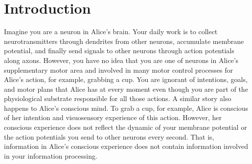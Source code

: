 \documentclass[utf8]{article}
\begin{document}

    \newpage
	\section{Introduction}

		Imagine you are a neuron in Alice's brain. Your daily work is to collect neurotransmitters through dendrites from other neurons, accumulate membrane potential, and finally send signals to other neurons through action potentials along axons. However, you have no idea that you are one of neurons in Alice's supplementary motor area and involved in many motor control processes for Alice's action, for example, grabbing a cup. You are ignorant of intentions, goals, and motor plans that Alice has at every moment even though you are part of the physiological substrate responsible for all those actions.
		A similar story also happens to Alice's conscious mind. To grab a cup, for example, Alice is conscious of her intention and visuosensory experience of this action. However, her conscious experience does not reflect the dynamic of your membrane potential or the action potentials you send to other neurons every second. That is, information in Alice's conscious experience does not contain information involved in your information processing.

\end{document}
